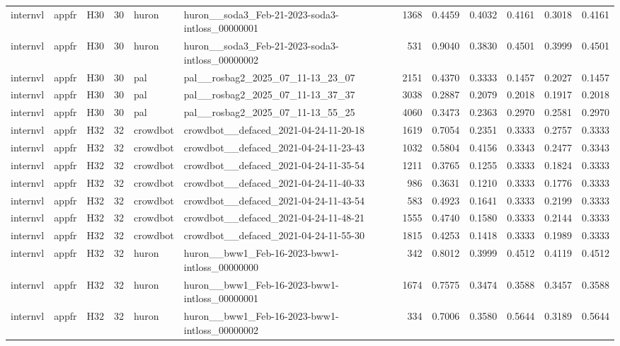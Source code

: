 \begin{table}[tbp]
\begin{tabular}{lllrllrrrrrr}
internvl & appfr & H30 & 30 & huron & huron\_\_soda3\_Feb-21-2023-soda3-intloss\_00000001 & 1368 & 0.4459 & 0.4032 & 0.4161 & 0.3018 & 0.4161 \\
internvl & appfr & H30 & 30 & huron & huron\_\_soda3\_Feb-21-2023-soda3-intloss\_00000002 & 531 & 0.9040 & 0.3830 & 0.4501 & 0.3999 & 0.4501 \\
internvl & appfr & H30 & 30 & pal & pal\_\_rosbag2\_2025\_07\_11-13\_23\_07 & 2151 & 0.4370 & 0.3333 & 0.1457 & 0.2027 & 0.1457 \\
internvl & appfr & H30 & 30 & pal & pal\_\_rosbag2\_2025\_07\_11-13\_37\_37 & 3038 & 0.2887 & 0.2079 & 0.2018 & 0.1917 & 0.2018 \\
internvl & appfr & H30 & 30 & pal & pal\_\_rosbag2\_2025\_07\_11-13\_55\_25 & 4060 & 0.3473 & 0.2363 & 0.2970 & 0.2581 & 0.2970 \\
internvl & appfr & H32 & 32 & crowdbot & crowdbot\_\_defaced\_2021-04-24-11-20-18 & 1619 & 0.7054 & 0.2351 & 0.3333 & 0.2757 & 0.3333 \\
internvl & appfr & H32 & 32 & crowdbot & crowdbot\_\_defaced\_2021-04-24-11-23-43 & 1032 & 0.5804 & 0.4156 & 0.3343 & 0.2477 & 0.3343 \\
internvl & appfr & H32 & 32 & crowdbot & crowdbot\_\_defaced\_2021-04-24-11-35-54 & 1211 & 0.3765 & 0.1255 & 0.3333 & 0.1824 & 0.3333 \\
internvl & appfr & H32 & 32 & crowdbot & crowdbot\_\_defaced\_2021-04-24-11-40-33 & 986 & 0.3631 & 0.1210 & 0.3333 & 0.1776 & 0.3333 \\
internvl & appfr & H32 & 32 & crowdbot & crowdbot\_\_defaced\_2021-04-24-11-43-54 & 583 & 0.4923 & 0.1641 & 0.3333 & 0.2199 & 0.3333 \\
internvl & appfr & H32 & 32 & crowdbot & crowdbot\_\_defaced\_2021-04-24-11-48-21 & 1555 & 0.4740 & 0.1580 & 0.3333 & 0.2144 & 0.3333 \\
internvl & appfr & H32 & 32 & crowdbot & crowdbot\_\_defaced\_2021-04-24-11-55-30 & 1815 & 0.4253 & 0.1418 & 0.3333 & 0.1989 & 0.3333 \\
internvl & appfr & H32 & 32 & huron & huron\_\_bww1\_Feb-16-2023-bww1-intloss\_00000000 & 342 & 0.8012 & 0.3999 & 0.4512 & 0.4119 & 0.4512 \\
internvl & appfr & H32 & 32 & huron & huron\_\_bww1\_Feb-16-2023-bww1-intloss\_00000001 & 1674 & 0.7575 & 0.3474 & 0.3588 & 0.3457 & 0.3588 \\
internvl & appfr & H32 & 32 & huron & huron\_\_bww1\_Feb-16-2023-bww1-intloss\_00000002 & 334 & 0.7006 & 0.3580 & 0.5644 & 0.3189 & 0.5644 \\

\end{tabular}
\end{table}
